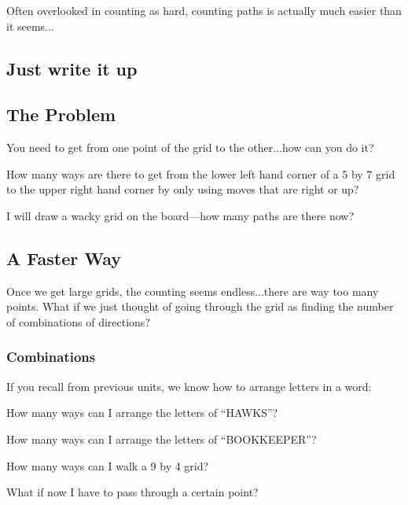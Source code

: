 Often overlooked in counting as hard, counting paths is actually much easier than it seems...

	\subsection{Just write it up}
		\subsection{The Problem}
			You need to get from one point of the grid to the other...how can you do it?
			
			\begin{problem} How many ways are there to get from the lower left hand corner of a 5 by 7 grid to the upper right hand corner by only using moves that are right or up?
			\end{problem}
			\vspace{1in}
			\begin{problem} I will draw a wacky grid on the board---how many paths are there now?
			\end{problem}
			\vspace{1in}
	\subsection{A Faster Way}			
			Once we get large grids, the counting seems endless...there are way too many points. What if we just thought of going through the grid as finding the number of combinations of directions?
			
		\subsubsection{Combinations}
			If you recall from previous units, we know how to arrange letters in a word:

			\begin{problem} How many ways can I arrange the letters of ``HAWKS''? 
			\end{problem}
			\vspace{1in}
			\begin{problem}How many ways can I arrange the letters of ``BOOKKEEPER''?
			\end{problem}
			\vspace{1in}			
			\begin{problem} How many ways can I walk a 9 by 4 grid?
			\end{problem}
			\vspace{1in}
			\begin{problem} What if now I have to pass through a certain point?
			\end{problem}
			\vspace{1in}
